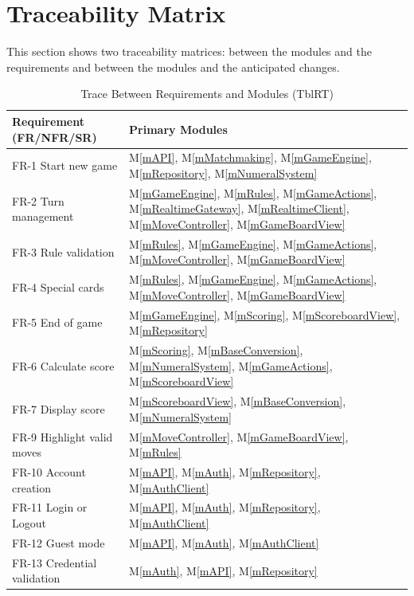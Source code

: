\documentclass[12pt, titlepage]{article}
\newcommand{\mref}[1]{M\ref{#1}}
\begin{document}
\section{Traceability Matrix} \label{SecTM}

This section shows two traceability matrices: between the modules and the requirements and between the modules and the anticipated changes.

\begin{table}[H]
\centering
\caption{Trace Between Requirements and Modules (TblRT)}
\label{TblRT}
\begin{tabularx}{\textwidth}{lX}
\toprule
\textbf{Requirement (FR/NFR/SR)} & \textbf{Primary Modules}\\
\midrule
FR-1 Start new game & \mref{mAPI}, \mref{mMatchmaking}, \mref{mGameEngine}, \mref{mRepository}, \mref{mNumeralSystem}\\
FR-2 Turn management & \mref{mGameEngine}, \mref{mRules}, \mref{mGameActions}, \mref{mRealtimeGateway}, \mref{mRealtimeClient}, \mref{mMoveController}, \mref{mGameBoardView}\\
FR-3 Rule validation & \mref{mRules}, \mref{mGameEngine}, \mref{mGameActions}, \mref{mMoveController}, \mref{mGameBoardView}\\
FR-4 Special cards & \mref{mRules}, \mref{mGameEngine}, \mref{mGameActions}, \mref{mMoveController}, \mref{mGameBoardView}\\
FR-5 End of game & \mref{mGameEngine}, \mref{mScoring}, \mref{mScoreboardView}, \mref{mRepository}\\
FR-6 Calculate score & \mref{mScoring}, \mref{mBaseConversion}, \mref{mNumeralSystem}, \mref{mGameActions}, \mref{mScoreboardView}\\
FR-7 Display score & \mref{mScoreboardView}, \mref{mBaseConversion}, \mref{mNumeralSystem}\\
FR-9 Highlight valid moves & \mref{mMoveController}, \mref{mGameBoardView}, \mref{mRules}\\
FR-10 Account creation & \mref{mAPI}, \mref{mAuth}, \mref{mRepository}, \mref{mAuthClient}\\
FR-11 Login or Logout & \mref{mAPI}, \mref{mAuth}, \mref{mRepository}, \mref{mAuthClient}\\
FR-12 Guest mode & \mref{mAPI}, \mref{mAuth}, \mref{mAuthClient}\\
FR-13 Credential validation & \mref{mAuth}, \mref{mAPI}, \mref{mRepository}\\

\end{tabularx}
\end{table}
\end{document}
